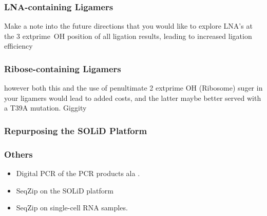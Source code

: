     \subsubsection{LNA-containing Ligamers}

    Make a note into the future directions that you would like to explore LNA’s at the 3  extprime~OH position of all ligation results, leading to increased ligation efficiency

    \subsubsection{Ribose-containing Ligamers}

    however both this and the use of penultimate 2  extprime OH (Ribosome) suger in your ligamers would lead to added costs, and the latter maybe better served with a T39A mutation. Giggity

    \subsubsection{Repurposing the SOLiD Platform}

    \subsubsection{Others}

    \begin{itemize}
      \item Digital PCR of the PCR products ala \citep{Shiroguchi2012a}. 
      \item SeqZip on the SOLiD platform
      \item SeqZip on single-cell RNA samples.  
      \end{itemize}

